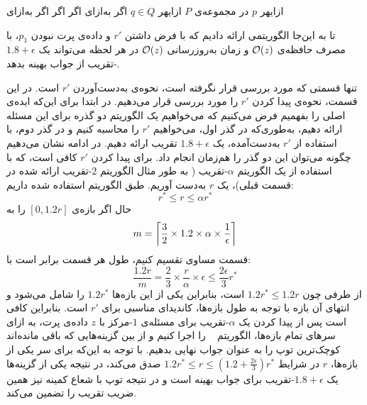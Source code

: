 ‌ازای{هر $p$ در مجموعه‌ی $P$}
‌ازای{هر $q \in Q$}
‌اگر{}
‌به‌ازای{}
‌اگر
‌اگر{}
‌اگر{}
‌به‌ازای{}

تا به این‌جا الگوریتمی ارائه دادیم که با فرض داشتن $r'$ و داده‌ی پرت نبودن $p_1$، با مصرف حافظه‌ی $\mathcal{O}(z)$ و زمان به‌روزرسانی $\mathcal{O}(z)$ در هر لحظه‌ می‌تواند یک $1.8 + \epsilon$-تقریب از جواب بهینه بدهد.

تنها قسمتی که مورد بررسی قرار نگرفته است، نحوه‌ی به‌دست‌آوردن $r'$ است. در این قسمت، نحوه‌ی پیدا کردن $r'$ را مورد بررسی قرار می‌دهیم. در ابتدا برای این‌که ایده‌ی اصلی را بفهمیم فرض می‌کنیم که می‌خواهیم یک الگوریتم دو گذره برای این مسئله ارائه دهیم، به‌طوری‌که در گذر اول، می‌خواهیم $r'$ را محاسبه کنیم و در گذر دوم، با استفاده از‌ $r'$ به‌دست‌آمده، یک $1.8 + \epsilon$ تقریب ارائه دهیم. در ادامه نشان می‌دهیم چگونه می‌توان این دو گذر را هم‌زمان انجام داد. برای پیدا کردن $r'$ کافی است، که با استفاده از یک الگوریتم $\alpha$-تقریب ( به طور مثال الگوریتم $2$-تقریب ارائه شده در قسمت قبلی)، یک $r$ به‌دست آوریم. طبق الگوریتم استفاده شده داریم:
$$r^* \leq r \leq \alpha r^*$$ 
حال اگر بازه‌ی $[0, 1.2r]$ را به 
$$m = \left\lceil{\frac{3}{2} \times 1.2 \times \alpha \times \frac{1}{\epsilon}}\right\rceil$$
 قسمت مساوی تقسیم کنیم، طول هر قسمت برابر است با:
 $$\frac{1.2  r}{m} = \frac{2}{3} \times \frac{r}{\alpha} \times \epsilon \leq \frac{2\epsilon}{3}r^*$$
 از طرفی چون $1.2r^* \leq 1.2r$ است، بنابراین یکی از این بازه‌ها $1.2r^*$ را شامل می‌شود و انتهای آن بازه با توجه به طول بازه‌ها، کاندیدای مناسبی برای $r'$ است. بنابراین کافی است پس از پیدا کردن یک $\alpha$-تقریب برای مسئله‌ی $1$-مرکز‌ با $z$ داده‌ی پرت، به ازای سرهای تمام بازه‌ها، الگوریتم ~ را اجرا کنیم و از بین گزینه‌هایی که باقی مانده‌اند کوچک‌ترین توپ را به عنوان جواب نهایی بدهیم. با توجه به این‌که برای سر یکی از بازه‌ها، $r$ در شرایط  $1.2r^* \leq r \leq (1.2 + \frac{2\epsilon}{3})r^*$  صدق می‌کند، در نتیجه یکی از گزینه‌ها یک $1.8 + \epsilon$-تقریب برای جواب بهینه است و در نتیجه توپ با شعاع کمینه نیز‌ همین ضریب تقریب را تضمین می‌کند.
 
